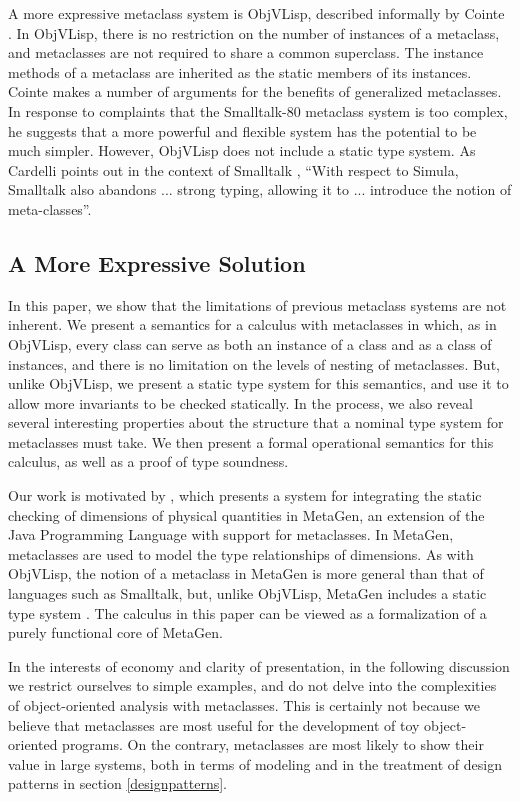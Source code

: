\documentclass[nocopyrightspace,10pt]{acm-sigplan}
\begin{document}
A more expressive metaclass system is ObjVLisp, described informally
by Cointe \cite{objvlisp}.  In ObjVLisp, there is no restriction on
the number of instances of a metaclass, and metaclasses are not
required to share a common superclass. The instance methods of a
metaclass are inherited as the static members of its instances.  Cointe
makes a number of arguments for the benefits of generalized
metaclasses.  In response to complaints that the Smalltalk-80 metaclass
system is too complex, he suggests that a more powerful and flexible
system has the potential to be much simpler.
However, ObjVLisp does not include a static type system.  As Cardelli
points out in the context of Smalltalk \cite{cardelli:multiple}, ``With
respect to Simula, Smalltalk also abandons ... strong typing, allowing
it to ... introduce the notion of meta-classes''.


\subsection{A More Expressive Solution}

In this paper, we show that the limitations of previous metaclass
systems are not inherent. We present a semantics for a calculus with
metaclasses in which, as in ObjVLisp, every class can serve as both an
instance of a class and as a class of instances, and there is no
limitation on the levels of nesting of metaclasses. But, unlike
ObjVLisp, we present a static type system for this semantics, and use
it to allow more invariants to be checked statically.  In the process,
we also reveal several interesting properties about the structure that
a nominal type system for metaclasses must take. We then present a
formal operational semantics for this calculus, as well as a proof of
type soundness.

Our work is motivated by \cite{DimUnits}, which presents a system for
integrating the static checking of dimensions of physical quantities
in MetaGen, an extension of the Java Programming Language with support
for metaclasses. In MetaGen, metaclasses are used to model the type
relationships of dimensions.  As with ObjVLisp, the notion of a
metaclass in MetaGen is more general than that of languages such as
Smalltalk, but, unlike ObjVLisp, MetaGen includes a static type system
\cite{DimUnits}. The calculus in this paper can be viewed as a
formalization of a purely functional core of MetaGen.

In the interests of economy and clarity of presentation, in the
following discussion we restrict ourselves to simple examples, and do
not delve into the complexities of object-oriented analysis with
metaclasses.  This is certainly not because we believe that
metaclasses are most useful for the development of toy object-oriented
programs.  On the contrary, metaclasses are most likely to show their
value in large systems, both in terms of modeling and in the treatment
of design patterns in section \ref{designpatterns}.
\end{document}
